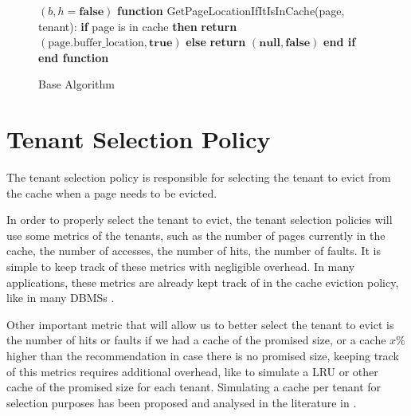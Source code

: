 \begin{figure}[htbp]
\begin{minipage}{\linewidth}
\begin{algorithm}[H]
\begin{algorithmic}
                    \RETURN $(b, h = \textbf{false})$
                \ENDIF
            \ENDIF
            \STATE
            \STATE \textbf{function} GetPageLocationIfItIsInCache(page, tenant):
            \STATE \hspace{\algorithmicindent} \textbf{if} page is in cache \textbf{then}
            \STATE \hspace{\algorithmicindent} \hspace{\algorithmicindent} \textbf{return} $(\text{page.buffer\_location}, \textbf{true})$
            \STATE \hspace{\algorithmicindent} \textbf{else}
            \STATE \hspace{\algorithmicindent} \hspace{\algorithmicindent} \textbf{return} $(\textbf{null}, \textbf{false})$
            \STATE \hspace{\algorithmicindent} \textbf{end if}
            \STATE \textbf{end function}
        \end{algorithmic}
    \end{algorithm}
    \caption{Base Algorithm}
    \label{fig:base_algorithm}
    \end{minipage}
\end{figure}
    

\section{Tenant Selection Policy}

The tenant selection policy is responsible for selecting the tenant
to evict from the cache when a page needs to be evicted.

In order to properly select the tenant to evict, the tenant selection policies will use 
some metrics of the tenants, such as the number of pages currently in the cache, 
the number of accesses, the number of hits, the number of faults. It is simple to 
keep track of these metrics with negligible overhead. In many applications, these 
metrics are already kept track of in the cache eviction policy, like in many DBMSs \cite{buffer-sharing-1}.

Other important metric that will allow us to better select the tenant to evict is 
the number of hits or faults if we had a cache of the promised size, or a cache 
$x\%$ higher than the recommendation in case there is no promised size, keeping track of 
this metrics requires additional overhead, like to simulate a LRU or other cache 
of the promised size for each tenant. Simulating a cache per tenant for selection 
purposes has been proposed and analysed in the literature in \cite{buffer-sharing-1}.

